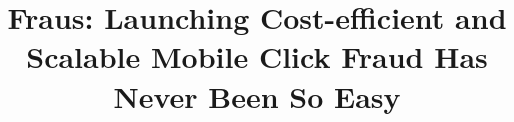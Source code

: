 \documentclass[conference]{IEEEtranl}
\begin{document}
	\title{Fraus: Launching Cost-efficient and Scalable Mobile Click Fraud Has Never Been So Easy}

\end{document}
